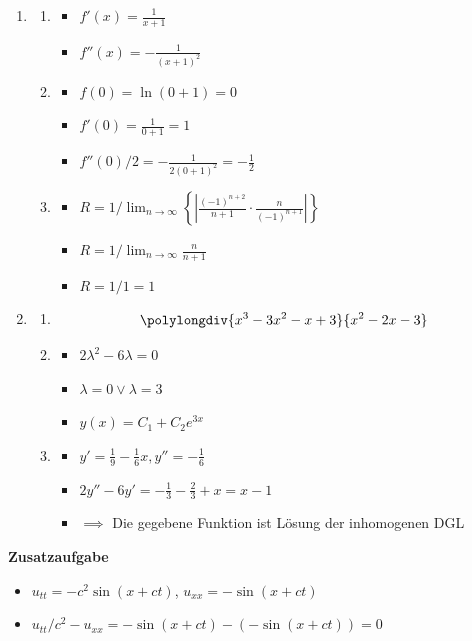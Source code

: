 \documentclass[12pt]{article}
\begin{document}
\begin{enumerate}
\begin{enumerate}
\end{enumerate}


\item
\begin{enumerate}

\item
\begin{itemize}
\item $f'(x) = \frac{1}{x+1}$
\item $f''(x) = -\frac{1}{(x+1)^2}$
\end{itemize}

\item
\begin{itemize}
\item $f(0)=\ln(0+1)=0$
\item $f'(0)=\frac{1}{0+1}=1$
\item $f''(0)/2=-\frac{1}{2(0+1)^2} = -\frac{1}{2}$
\end{itemize}

\item
\begin{itemize}
\item $R = 1/\lim_{n \to \infty} \left\{|\frac{(-1)^{n+2}}{n+1} \cdot \frac{n}{(-1)^{n+1}}|\right\}$
\item $R = 1/\lim_{n \to \infty} \frac{n}{n+1}$
\item $R = 1/1 = 1$
\end{itemize}

\end{enumerate}


\newpage

\item 
\begin{enumerate}

\item
\[\polylongdiv{x^3-3x^2-x+3}{x^2-2x-3}\]

\item 
\begin{itemize}
\item $2\lambda^2-6\lambda = 0$
\item $\lambda = 0 \lor \lambda = 3$
\item $y(x) = C_1 + C_2 e^{3x}$
\end{itemize}

\item 
\begin{itemize}
\item $y' = \frac{1}{9}-\frac{1}{6}x, y'' = -\frac{1}{6}$
\item $2y'' - 6y' = -\frac{1}{3} - \frac{2}{3} + x = x -1$
\item $\implies$ Die gegebene Funktion ist Lösung der inhomogenen DGL
\end{itemize}

\end{enumerate}

\end{enumerate}

\textbf{Zusatzaufgabe}

\begin{itemize}
\item $u_{tt} = -c^2\sin(x+ct)$, $u_{xx} = -\sin(x+ct)$
\item $u_{tt}/c^2 - u_{xx} = -\sin(x+ct) - (-\sin(x+ct)) = 0$
\end{itemize}
\end{document}
